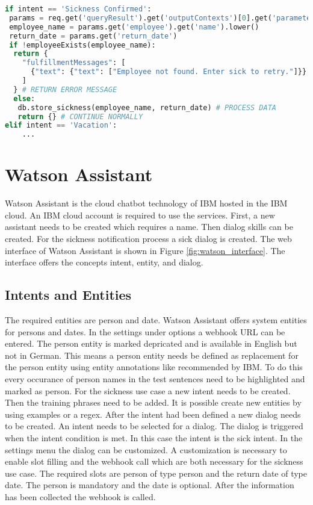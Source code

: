 \begin{lstlisting}[caption={Dialogflow Intent Handling}, label={lst:dialogflow_intent_handling},captionpos=b,frame=single,language={Python},commentstyle=\color{mygreen},keywordstyle=\color{blue},
    morekeywords={}]                
if intent == 'Sickness Confirmed':
 params = req.get('queryResult').get('outputContexts')[0].get('parameters')
 employee_name = params.get('employee').get('name').lower()
 return_date = params.get('return_date')
 if !employeeExists(employee_name):
  return {
    "fulfillmentMessages": [
      {"text": {"text": ["Employee not found. Enter sick to retry."]}}
    ]
  } # RETURN ERROR MESSAGE
  else:
   db.store_sickness(employee_name, return_date) # PROCESS DATA
   return {} # CONTINUE NORMALLY
elif intent == 'Vacation':
    ...
\end{lstlisting}  

\section{Watson Assistant}
Watson Assistant\citet{watsonassistant} is the cloud chatbot technology of IBM
hosted in the IBM cloud.
An IBM cloud account is required to use the services.
First, a new assistant needs to be created which requires a name.
Then dialog skills can be created.
For the sickness notification process a sick dialog is created.
The web interface of Watson Assistant is shown in Figure \ref{fig:watson_interface}.
The interface offers the concepts intent, entity, and dialog.

\subsection{Intents and Entities}
The required entities are person and date.
Watson Assistant offers system entities for persons and dates.
In the settings under options a webhook URL can be entered.
The person entity is marked depricated and is available in English but not in German.
This means a person entity needs be defined as replacement for the person 
entity using entity annotations like 
recommended by IBM.
To do this every occurance of person names in the test sentences need to be highlighted 
and marked as person.
For the sickness use case a new intent needs to be created.
Then the training phrases need to be added.
It is possible create new entities by using examples or a regex.
After the intent had been defined a new dialog needs to be created.
An intent needs to be selected for a dialog.
The dialog is triggered when the intent condition is met.
In this case the intent is the sick intent.
In the settings menu the dialog can be customized.
A customization is necessary to enable slot filling and 
the webhook call which are both necessary for the sickness 
use case.
The required slots are person of type person and the return date of type date.
The person is mandatory and the date is optional.
After the information has been collected the webhook is called.

